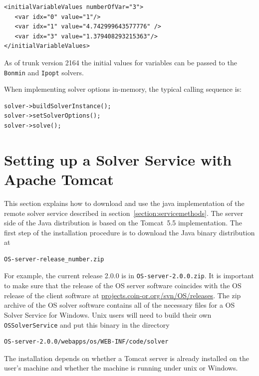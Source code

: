 \documentclass[11pt]{article}
\renewcommand{\_}{{\char"5F}}
\renewcommand{\{}{{\char"7B}}
\renewcommand{\}}{{\char"7D}}
\renewcommand{\^}{{\char"0D}}
\renewcommand{\'}{{\char"0D}}
\begin{document}
\begin{enumerate}[Step 1:]
\begin{verbatim}
<initialVariableValues numberOfVar="3">
   <var idx="0" value="1"/>
   <var idx="1" value="4.742999643577776" />
   <var idx="3" value="1.379408293215363"/>
</initialVariableValues>
\end{verbatim}

As of trunk version 2164 the initial values for variables can be passed
to the {\tt Bonmin} and {\tt Ipopt} solvers.


When implementing solver options in-memory, the typical calling sequence is:

\begin{verbatim}
solver->buildSolverInstance();
solver->setSolverOptions();
solver->solve();
\end{verbatim}






\section{Setting up a Solver Service with Apache Tomcat}\label{section:tomcat}

This section explains how to download and use the java implementation of the remote solver service 
described in section~\ref{section:servicemethods}.
The server side of the Java distribution is based on the Tomcat~5.5 implementation. 
The first step of the installation procedure is to download the Java binary distribution at
\begin{verbatim}
OS-server-release_number.zip
\end{verbatim}

For example, the current release 2.0.0 is in {\tt OS-server-2.0.0.zip}.  It is important to make sure that the release of the OS server software coincides with the OS release of the client software at \url{projects.coin-or.org/svn/OS/releases}.
The  zip archive of the OS solver software contains all of the necessary files for a OS Solver Service for Windows.  Unix users will need to build their own {\tt OSSolverService}  and put this binary in the directory
\begin{verbatim}
OS-server-2.0.0/webapps/os/WEB-INF/code/solver 
\end{verbatim}


The installation depends on
whether a Tomcat server is already installed on the user's machine and whether the machine is running
under unix or Windows.


\end{enumerate}
\end{document}

